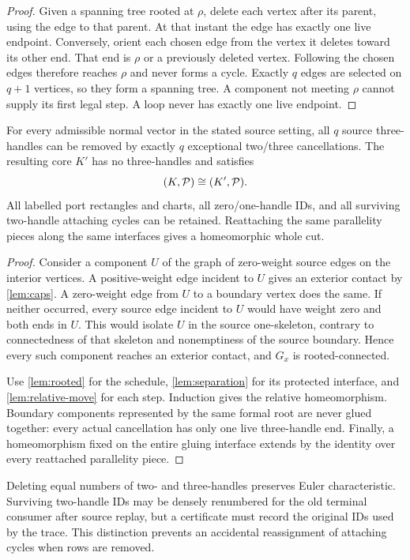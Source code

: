 \begin{proof}
Given a spanning tree rooted at $\rho$, delete each vertex after its parent,
using the edge to that parent. At that instant the edge has exactly one live
endpoint. Conversely, orient each chosen edge from the vertex it deletes
toward its other end. That end is $\rho$ or a previously deleted vertex.
Following the chosen edges therefore reaches $\rho$ and never forms a
cycle. Exactly $q$ edges are selected on $q+1$ vertices, so they form a
spanning tree. A component not meeting $\rho$ cannot supply its first legal
step. A loop never has exactly one live endpoint.
\end{proof}

\begin{theorem}
\label{thm:top}
For every admissible normal vector in the stated source setting, all $q$
source three-handles can be removed by exactly $q$ exceptional two/three
cancellations. The resulting core $K'$ has no three-handles and satisfies
\[
 (K,\mathcal P)\cong(K',\mathcal P).
\]
All labelled port rectangles and charts, all zero/one-handle IDs, and all
surviving two-handle attaching cycles can be retained. Reattaching the same
parallelity pieces along the same interfaces gives a homeomorphic whole
cut.
\end{theorem}

\begin{proof}
Consider a component $U$ of the graph of zero-weight source edges on the
interior vertices. A positive-weight edge incident to $U$ gives an exterior
contact by \cref{lem:caps}. A zero-weight edge from $U$ to a boundary vertex
does the same. If neither occurred, every source edge incident to $U$ would
have weight zero and both ends in $U$. This would isolate $U$ in the source
one-skeleton, contrary to connectedness of that skeleton and nonemptiness
of the source boundary. Hence every such component reaches an exterior
contact, and $G_x$ is rooted-connected.

Use \cref{lem:rooted} for the schedule, \cref{lem:separation} for its protected
interface, and \cref{lem:relative-move} for each step. Induction gives the
relative homeomorphism. Boundary components represented by the same formal
root are never glued together: every actual cancellation has only one live
three-handle end. Finally, a homeomorphism fixed on the entire gluing
interface extends by the identity over every reattached parallelity piece.
\end{proof}

Deleting equal numbers of two- and three-handles preserves Euler
characteristic. Surviving two-handle IDs may be densely renumbered for the
old terminal consumer after source replay, but a certificate must record
the original IDs used by the trace. This distinction prevents an accidental
reassignment of attaching cycles when rows are removed.
